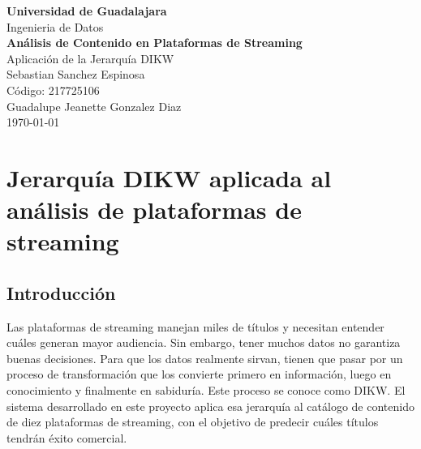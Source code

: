 \documentclass[12pt,a4paper]{article}
\begin{document}
\onehalfspacing

\begin{titlepage}
    \centering
    \vspace*{3cm}

    {\Large \textbf{Universidad de Guadalajara}}\\[0.5cm]
    {\large Ingenieria de Datos}\\[3cm]

    {\LARGE \textbf{An\'alisis de Contenido en Plataformas de Streaming}}\\[0.5cm]
    {\large Aplicaci\'on de la Jerarqu\'ia DIKW}\\[3cm]

    {\large Sebastian Sanchez Espinosa}\\[0.3cm]
    {\large C\'odigo: 217725106}\\[3cm]

    {\large Guadalupe Jeanette Gonzalez Diaz}\\[2cm]

    {\large \today}

    \vfill
\end{titlepage}

\section*{Jerarqu\'ia DIKW aplicada al an\'alisis de plataformas de streaming}

\subsection*{Introducci\'on}

Las plataformas de streaming manejan miles de t\'itulos y necesitan entender cu\'ales generan mayor audiencia. Sin embargo, tener muchos datos no garantiza buenas decisiones. Para que los datos realmente sirvan, tienen que pasar por un proceso de transformaci\'on que los convierte primero en informaci\'on, luego en conocimiento y finalmente en sabidur\'ia. Este proceso se conoce como DIKW. El sistema desarrollado en este proyecto aplica esa jerarqu\'ia al cat\'alogo de contenido de diez plataformas de streaming, con el objetivo de predecir cu\'ales t\'itulos tendr\'an \'exito comercial.
\end{document}
